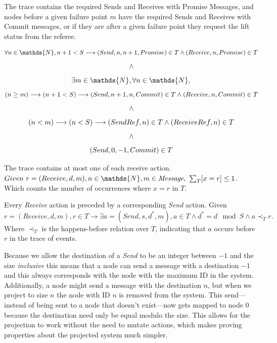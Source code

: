 \documentclass[runningheads]{llncs}
\newcommand{\happensbefore}{\prec_T}
\begin{document}
\begin{definition} The trace contains the required Sends and Receives with Promise Messages, and nodes before a given failure point $m$ have the required Sends and Receives with Commit messages, or if they are after a given failure point they request the lift status from the referee.

$$
   \forall n \in \mathds{N}, n + 1 < S \longrightarrow \\
   (Send, n, n+1, Promise) \in T \wedge (Receive, n, Promise) \in T\ \\
$$
$$ \wedge \\ $$
$$
   \exists m \in \mathds{N}, \forall n \in \mathds{N}, \\
$$
$$
   (n \ge m) \longrightarrow (n + 1 < S) \longrightarrow \\
   (Send, n+1, n, Commit) \in T \wedge (Receive, n, Commit) \in T\ \\
$$
$$ \wedge \\ $$
$$
   (n < m) \longrightarrow (n < S) \longrightarrow \\
   (SendRef, n) \in T \wedge (ReceiveRef, n) \in T\ \\
$$
$$ \wedge \\ $$
$$
    (Send, 0, -1, Commit) \in T \\
$$
\end{definition}

\begin{definition}
The trace contains at most one of each receive action. 
$Given\ r = (Receive, d, m), n \in \mathds{N}, m \in \emph{Message},\ \sloppy{\sum_{T}[x=r]} \le 1$. Which counts the number of occurrences where $x=r$ in $T$. 
\end{definition}

\begin{definition}
Every \emph{Receive} action is preceded by a corresponding \emph{Send} action. 
Given $r = (Receive, d, m), r \in T \longrightarrow \exists a = (Send, s, d^*, m), a \in T \wedge d^* = d \mod S \wedge a \happensbefore r.$ Where $\happensbefore$ is the happens-before relation over $T$, indicating that $a$ occurs before $r$ in the trace of events. 
\end{definition}

Because we allow the destination of a \emph{Send} to be an integer between $-1$ and the size \emph{inclusive} this means that a node can send a message with a destination $-1$ and this always corresponds with the node with the maximum ID in the system. Additionally, a node might send a message with the destination $n$, but when we project to size $n$ the node with ID $n$ is removed from the system. This send---instead of being sent to a node that doesn't exist---now gets mapped to node $0$ because the destination need only be equal modulo the size. This allows for the projection to work without the need to mutate actions, which makes proving properties about the projected system much simpler.  
\end{document}
